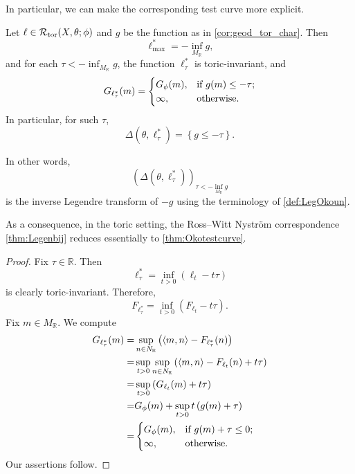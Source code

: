 In particular, we can make the corresponding test curve more explicit.
\begin{corollary}\label{cor:RWN_toric}
    Let $\ell\in \mathcal{R}_{\mathrm{tor}}(X,\theta;\phi)$ and $g$ be the function as in \cref{cor:geod_tor_char}. Then
    \begin{equation}\label{eq:ellmax_temp1}
    \ell^*_{\max}=-\inf_{M_{\mathbb{R}}} g,
    \end{equation}
    and for each $\tau<-\inf_{M_{\mathbb{R}}} g$, the function $\ell^*_{\tau}$ is toric-invariant, and
    \[
    G_{\ell^*_{\tau}}(m)=\begin{cases}
        G_{\phi}(m),&\textup{if }g(m)\leq -\tau;\\
        \infty,&\textup{otherwise}.
    \end{cases}
    \]
    In particular, for such $\tau$,
    \[
    \Delta\left(\theta, \ell^*_{\tau}\right)=\left\{g\leq -\tau\right\}.
    \]
\end{corollary}
In other words,
\[
\left(\Delta\left(\theta, \ell^*_{\tau}\right)\right)_{\tau<-\inf_{M_{\mathbb{R}}} g}
\]
is the inverse Legendre transform of $-g$ using the terminology of \cref{def:LegOkoun}.

As a consequence, in the toric setting, the Ross--Witt Nyström correspondence \cref{thm:Legenbij} reduces essentially to \cref{thm:Okotestcurve}.
\begin{proof}
    Fix $\tau\in \mathbb{R}$. Then
    \[
    \ell^*_{\tau}=\inf_{t>0} \left(\ell_t-t\tau\right)
    \]
    is clearly toric-invariant.
    Therefore,
    \[
    F_{\ell^*_{\tau}}=\inf_{t>0} \left(F_{\ell_t}-t\tau\right).
    \]
    Fix $m\in M_{\mathbb{R}}$. We compute
    \[
    \begin{aligned}
    G_{\ell^*_{\tau}}(m)=& \sup_{n\in N_{\mathbb{R}}}\left( \langle m, n\rangle -F_{\ell^*_{\tau}}(n) \right)\\
    =& \sup_{t>0}\sup_{n\in N_{\mathbb{R}}}\left( \langle m, n\rangle - F_{\ell_t}(n) +t\tau\right)\\
    =&\sup_{t>0} \left(G_{\ell_t}(m)+t\tau \right)\\
    =& G_{\phi}(m)+\sup_{t>0} t\left(g(m)+\tau\right)\\
    =& \begin{cases}
        G_{\phi}(m),&\textup{if }g(m)+\tau\leq 0;\\
        \infty,&\textup{otherwise}.
    \end{cases}
    \end{aligned}
    \]
    Our assertions follow.
\end{proof}


